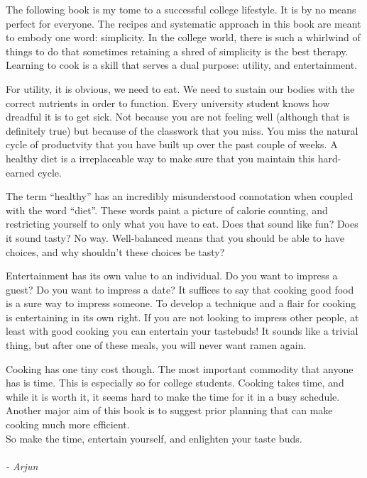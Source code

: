 
The following book is my tome to a successful college lifestyle. It is by no means perfect for everyone. The recipes and systematic approach in this book are meant to embody one word: simplicity. In the college world, there is such a whirlwind of things to do that sometimes retaining a shred of simplicity is the best therapy. Learning to cook is a skill that serves a dual purpose: utility, and entertainment. 

For utility, it is obvious, we need to eat. We need to sustain our bodies with the correct nutrients in order to function. Every university student knows how dreadful it is to get sick. Not because you are not feeling well (although that is definitely true) but because of the classwork that you miss. You miss the natural cycle of productvity that you have built up over the past couple of weeks. A healthy diet is a irreplaceable way to make sure that you maintain this hard-earned cycle. 

The term ``healthy'' has an incredibly misunderstood connotation when coupled with the word ``diet''. These words paint a picture of calorie counting, and restricting yourself to only what you have to eat. Does that sound like fun? Does it sound tasty? No way. Well-balanced means that you should be able to have choices, and why shouldn't these choices be tasty? 

Entertainment has its own value to an individual. Do you want to impress a guest? Do you want to impress a date? It suffices to say that cooking good food is a sure way to impress someone. To develop a technique and a flair for cooking is entertaining in its own right. If you are not looking to impress other people, at least with good cooking you can entertain your tastebuds! It sounds like a trivial thing, but after one of these meals, you will never want ramen again. 

Cooking has one tiny cost though. The most important commodity that anyone has is time. This is especially so for college students. Cooking takes time, and while it is worth it, it seems hard to make the time for it in a busy schedule. Another major aim of this book is to suggest prior planning that can make cooking much more efficient.\\
So make the time, entertain yourself, and enlighten your taste buds.
\\\\
\textit{- Arjun} 

